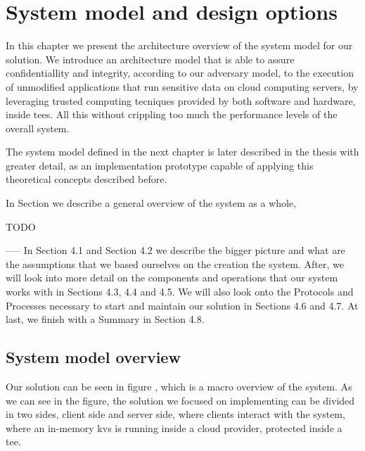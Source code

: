 \chapter{System model and design options}
\label{cha:systemModel_and_designOptions}

In this chapter we present the architecture overview of the system model for our solution. We introduce an architecture model that is able to assure confidentiallity and integrity, according to our adversary model, to the execution of unmodified applications that run sensitive data on cloud computing servers, by leveraging trusted computing tecniques provided by both software and hardware, inside \gls{tee}s. All this without crippling too much the performance levels of the overall system.

The system model defined in the next chapter is later described in the thesis with greater detail, as an implementation prototype capable of applying this theoretical concepts described before.

In Section \cite{sec:systemModel_overview} we describe a general overview of the system as a whole, 

TODO


-----
In Section
4.1 and Section 4.2 we describe the bigger picture and what are the assumptions that
we based ourselves on the creation the system. After, we will look into more detail on
the components and operations that our system works with in Sections 4.3, 4.4 and 4.5.
We will also look onto the Protocols and Processes necessary to start and maintain our
solution in Sections 4.6 and 4.7. At last, we finish with a Summary in Section 4.8.



\section{System model overview} %
\label{sec:systemModel_overview}

Our solution can be seen in figure \cite{fig:systemModel}, which is a macro overview of the system. As we can see in the figure, the solution we focused on implementing can be divided in two sides, client side and server side, where clients interact with the system, where an in-memory \gls{kvs} is running inside a cloud provider, protected inside a \gls{tee}. 

